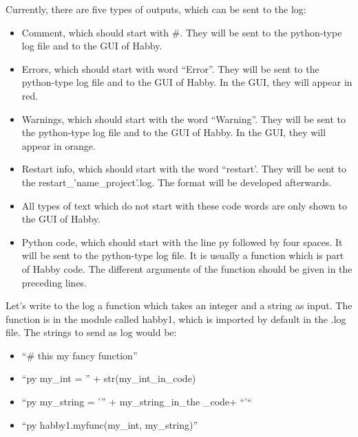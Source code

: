 \documentclass[letterpaper,10pt,english]{sphinxmanual}
\begin{document}

Currently, there are five types of outputs, which can be sent to the log:
\begin{itemize}
\item {} 
Comment, which should start with \#. They will be sent to the python-type log file and to the GUI of Habby.

\item {} 
Errors, which should start with word “Error”. They will be sent to the python-type log file and to the GUI of Habby. In the GUI, they will appear in red.

\item {} 
Warnings, which should start with the word “Warning”. They will be sent to the python-type log file and to the GUI of Habby. In the GUI, they will appear in orange.

\item {} 
Restart info, which should start with the word “restart’. They will be sent to the restart\_’name\_project’.log. The format will be developed afterwards.

\item {} 
All types of text which do not start with these code words are only shown to the GUI of Habby.

\item {} 
Python code, which should start with the line py followed by four spaces.  It will be sent to the python-type log file. It is usually a function which is part of Habby code. The different arguments of the function should be given in the preceding lines.

\end{itemize}


Let’s write to the log a function which takes an integer and a string as input. The function
is in the module called habby1, which is imported by default in the .log file. The strings to send
as log would be:
\begin{itemize}
\item {} 
``\#  this my fancy function''

\item {} 
``py    my\_int = '' + str(my\_int\_in\_code)

\item {} 
``py    my\_string = ’” + my\_string\_in\_the \_code+ ``'“

\item {} 
``py    habby1.myfunc(my\_int, my\_string)''

\end{itemize}
\end{document}
